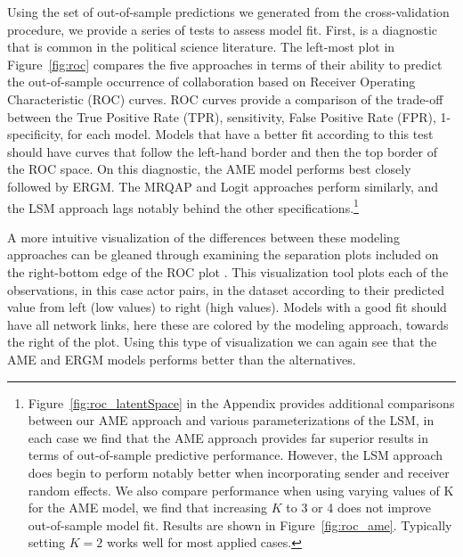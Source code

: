\documentclass[12pt,onesided,pdflatex]{amsart}
\begin{document}
Using the set of out-of-sample predictions we generated from the cross-validation procedure, we provide a series of tests to assess model fit. First, is a diagnostic that is common in the political science literature. The left-most plot in Figure~\ref{fig:roc} compares the five approaches in terms of their ability to predict the out-of-sample occurrence of collaboration based on Receiver Operating Characteristic (ROC) curves. ROC curves provide a comparison of the trade-off between the True Positive Rate (TPR), sensitivity, False Positive Rate (FPR), 1-specificity, for each model. Models that have a better fit according to this test should have curves that follow the left-hand border and then the top border of the ROC space. On this diagnostic, the AME model performs best closely followed by ERGM. The MRQAP and Logit approaches perform similarly, and the LSM approach lags notably behind the other specifications.\footnote{Figure~\ref{fig:roc_latentSpace} in the Appendix provides additional comparisons between our AME approach and various parameterizations of the LSM, in each case we find that the AME approach provides far superior results in terms of out-of-sample predictive performance. However, the LSM approach does begin to perform notably better when incorporating sender and receiver random effects. We also compare performance when using varying values of K for the AME model, we find that increasing $K$ to 3 or 4 does not improve out-of-sample model fit. Results are shown in Figure~\ref{fig:roc_ame}. Typically setting $K=2$ works well for most applied cases.} 

A more intuitive visualization of the differences between these modeling approaches can be gleaned through examining the separation plots included on the right-bottom edge of the ROC plot \citep{greenhill:etal:2011}. This visualization tool plots each of the observations, in this case actor pairs, in the dataset according to their predicted value from left (low values) to right (high values). Models with a good fit should have all network links, here these are colored by the modeling approach, towards the right of the plot. Using this type of visualization we can again see that the AME and ERGM models performs better than the alternatives.
\end{document}
